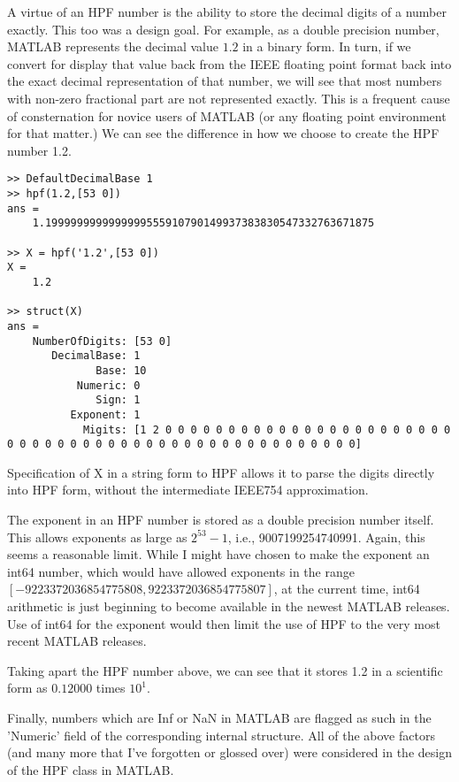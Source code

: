 \documentclass[a4paper,12pt]{article}
\begin{document}
A virtue of an HPF number is the ability to store the decimal digits of a number exactly. This too was a design goal. For example, as a double precision number, MATLAB represents the decimal value $1.2$ in a binary form. In turn, if we convert for display that value back from the IEEE floating point format back into the exact decimal representation of that number, we will see that most numbers with non-zero fractional part are not represented exactly. This is a frequent cause of consternation for novice users of MATLAB (or any floating point environment for that matter.) We can see the difference in how we choose to create the HPF number 1.2.

\begin{lstlisting}
>> DefaultDecimalBase 1
>> hpf(1.2,[53 0])
ans =
    1.1999999999999999555910790149937383830547332763671875

>> X = hpf('1.2',[53 0])
X =
    1.2

>> struct(X)
ans =
    NumberOfDigits: [53 0]
       DecimalBase: 1
              Base: 10
           Numeric: 0
              Sign: 1
          Exponent: 1
            Migits: [1 2 0 0 0 0 0 0 0 0 0 0 0 0 0 0 0 0 0 0 0 0 0 0 0 0 0 0 0 0 0 0 0 0 0 0 0 0 0 0 0 0 0 0 0 0 0 0 0 0 0 0 0]
\end{lstlisting}

Specification of X in a string form to HPF allows it to parse the digits directly into HPF form, without the intermediate IEEE754 approximation.

The exponent in an HPF number is stored as a double precision number itself. This allows exponents as large as $2^{53}-1$, i.e., 9007199254740991. Again, this seems a reasonable limit. While I might have chosen to make the exponent an int64 number, which would have allowed exponents in the range \\ $[-9223372036854775808,  9223372036854775807]$, at the current time, int64 arithmetic is just beginning to become available in the newest MATLAB releases. Use of int64 for the exponent would then limit the use of HPF to the very most recent MATLAB releases.

Taking apart the HPF number above, we can see that it stores 1.2 in a scientific form as $0.12000$ times $10^1$.

Finally, numbers which are Inf or NaN in MATLAB are flagged as such in the 'Numeric' field of the corresponding internal structure. All of the above factors (and many more that I've forgotten or glossed over) were considered in the design of the HPF class in MATLAB.
\end{document}
